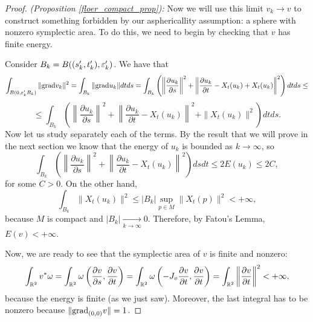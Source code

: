\begin{proof} {\it (Proposition \ref{floer_compact_prop}):}
Now we will use this limit $v_k \rightarrow v$ to construct something forbidden by our asphericallity assumption: a sphere with nonzero symplectic area. To do this, we need to begin by checking that $v$ has finite energy.

Consider $B_k = B((s_k',t_k'),\varepsilon_k')$. We have that
\[\int_{B(0,\varepsilon_k'R_k)} \|\text{grad} v_k\|^2 = \int_{B_k} \|\text{grad} u_k\| dt ds = \int_{B_k} \left( \left\| \frac{\partial u_k}{\partial s} \right\|^2 + \left\| \frac{\partial u_k}{\partial t} - X_t(u_k) + X_t(u_k) \right\|^2 \right)dt ds \leq\]
\[\leq \int_{B_k} \left( \left\|\frac{\partial u_k}{\partial s}\right\|^2 + \left\|\frac{\partial u_k}{\partial t} - X_t(u_k) \right\|^2 + \|X_t(u_k)\|^2 \right) dt ds .\]
Now let us study separately each of the terms. By the result that we will prove in the next section we know that the energy of $u_k$ is bounded as $k \rightarrow \infty$, so
\[\int_{B_k} \left( \left\| \frac{\partial u_k}{\partial s} \right\|^2 + \left\| \frac{\partial u_k}{\partial t} - X_t(u_k) \right\|^2 \right) ds dt \leq 2E(u_k) \leq 2C,\]
for some $C > 0$. On the other hand,
\[\int_{B_k} \|X_t(u_k)\|^2 \leq |B_k| \sup_{p \in M} \|X_t(p)\|^2 < +\infty ,\]
because $M$ is compact and $|B_k| \xrightarrow[k \rightarrow \infty]{} 0$. Therefore, by Fatou's Lemma, $E(v) < +\infty$.

Now, we are ready to see that the symplectic area of $v$ is finite and nonzero:
\[\int_{\mathbb{R}^2} v^{\ast} \omega = \int_{\mathbb{R}^2} \omega\left(\frac{\partial v}{\partial s}, \frac{\partial v}{\partial t}\right) = \int_{\mathbb{R}^2} \omega\left(-J_v \frac{\partial v}{\partial t}, \frac{\partial v}{\partial t}\right) = \int_{\mathbb{R}^2} \left\| \frac{\partial v}{\partial t} \right\|^2 < + \infty ,\]
because the energy is finite (as we just saw). Moreover, the last integral has to be nonzero because $\|\text{grad}_{(0,0)}v\| = 1$.


\end{proof}
